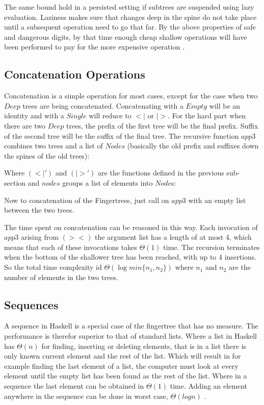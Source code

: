 The same bound hold in a persisted setting if subtrees are suspended using lazy
evaluation. Laziness makes sure that changes deep in the spine do not take place
until a subsequent operation need to go that far. By the above properties
of safe and dangerous digits, by that time enough cheap shallow operations
will have been performed to pay for the more expensive operation \cite{fingertree}.

\subsection{Concatenation Operations}
Concatenation is a simple operation for most cases, except for the case when two $Deep$ trees are being concatenated. Concatenating with a $Empty$ will be an identity and with a $Single$ will reduce to $<|$ or $|>$. For the hard part when there are two $Deep$ trees, the prefix of the first tree will be the final prefix. Suffix of the second tree will be the suffix of the final tree. The recursive function $app3$ combines two trees and a list of $Nodes$ (basically the old prefix and suffixes down the spines of the old trees):



Where $(<|')$ and $(|>')$ are the functions defined in the previous sub-section and $nodes$ groups a list of elements into $Node$s: 



Now to concatenation of the Fingertrees, just call on $app3$ with an empty list between the two trees.



The time spent on concatenation can be reasoned in this way. Each invocation of $app3$ arising from $(><)$ the argument list has a length of at most 4, which means that each of these invocations takes $\Theta(1)$ time. The recursion terminates when the bottom of the shallower tree has been reached, with up to 4 insertions. So the total time complexity id $\Theta(\log min\{n_1, n_2\})$ where $n_1$ and $n_2$ are the number of elements in the two trees. 

\subsection{Sequences}
A sequence in Haskell is a special case of the fingertree that has no measure.
The performance is therefor superior to that of standard lists. Where a list in Haskell has
$\Theta(n)$ for finding, inserting or deleting elements, that is in a list there
is only known current element and the rest of the list. Which will result in for
example finding the last element of a list, the computer must look at every
element until the empty list has been found as the rest of the list. Where in a
sequence the last element can be obtained in $\Theta(1)$ time. Adding an element
anywhere in the sequence can be done in worst case, $\Theta(log n)$
\cite{fingertree}.

